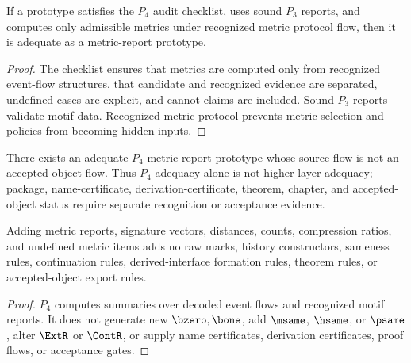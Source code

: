 \begin{theorem}
\label{thm:metric-report-p4-adequacy}
If a prototype satisfies the $P_4$ audit checklist, uses sound $P_3$ reports, and computes only admissible metrics under recognized metric protocol flow, then it is adequate as a metric-report prototype.
\end{theorem}

\begin{proof}
The checklist ensures that metrics are computed only from recognized event-flow structures, that candidate and recognized evidence are separated, undefined cases are explicit, and cannot-claims are included. Sound $P_3$ reports validate motif data. Recognized metric protocol prevents metric selection and policies from becoming hidden inputs.
\end{proof}

\begin{corollary}
\label{cor:metric-report-p4-not-higher}
There exists an adequate $P_4$ metric-report prototype whose source flow is not an accepted object flow. Thus $P_4$ adequacy alone is not higher-layer adequacy; package, name-certificate, derivation-certificate, theorem, chapter, and accepted-object status require separate recognition or acceptance evidence.
\end{corollary}

\begin{theorem}
\label{thm:metric-report-p4-conservative}
Adding metric reports, signature vectors, distances, counts, compression ratios, and undefined metric items adds no raw marks, history constructors, sameness rules, continuation rules, derived-interface formation rules, theorem rules, or accepted-object export rules.
\end{theorem}

\begin{proof}
$P_4$ computes summaries over decoded event flows and recognized motif reports. It does not generate new $\bzero,\bone$, add $\msame$, $\hsame$, or $\psame$, alter $\ExtR$ or $\ContR$, or supply name certificates, derivation certificates, proof flows, or acceptance gates.
\end{proof}

